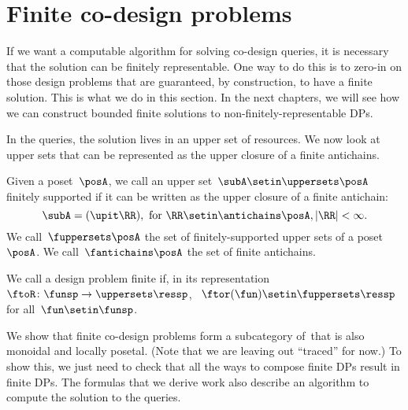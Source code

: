 \section{Finite co-design problems}

If we want a computable algorithm for solving co-design queries, it is necessary that the solution can be finitely representable.
One way to do this is to zero-in on those design problems that are guaranteed, by construction, to have a finite solution.
This is what we do in this section.
In the next chapters, we will see how we can construct bounded finite solutions to non-finitely-representable DPs.

In the \FixFunMinRes queries, the solution lives in an upper set of resources.
We now look at upper sets that can be represented as the upper closure of a finite antichains.

\begin{definition}
    \label{def:fuppersets}
    Given a poset~$\posA$, we call an upper set~$\subA \setin \uppersets \posA$ finitely supported
    if it can be written as the upper closure of a finite antichain:
    \begin{equation}
        \subA = (\upit\RR), \text{ for } \RR \setin \antichains \posA, \vert\RR\vert < \infty.
    \end{equation}
    We call~$\fuppersets \posA$ the set of finitely-supported upper sets of a poset~$\posA$.
    We call~$\fantichains \posA$ the set of finite antichains.
\end{definition}

\begin{definition}
    \label{def:finite_des_prob}
    We call a design problem finite if, in its representation~$\ftoR \colon \funsp \to \uppersets \ressp$,
    ~$\ftor(\fun) \setin \fuppersets\ressp$ for all~$\fun\setin\funsp$.
\end{definition}

We show that finite co-design problems form a subcategory of~\DP that is also monoidal and locally posetal.
(Note that we are leaving out ``traced'' for now.) To show this, we just need to check that all the ways to compose finite DPs result in finite DPs.
The formulas that we derive work also describe an algorithm to compute the solution to the queries.

